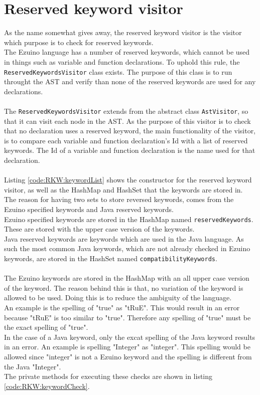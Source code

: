 \section{Reserved keyword visitor}
As the name somewhat gives away, the reserved keyword visitor is the visitor which purpose is to check for reserved keywords.\\
The Ezuino language has a number of reserved keywords, which cannot be used in things such as variable and function declarations. To uphold this rule, the \texttt{ReservedKeywordsVisitor} class exists. The purpose of this class is to run throught the AST and verify than none of the reserved keywords are used for any declarations.
\\\\
The \texttt{ReservedKeywordsVisitor} extends from the abstract class \texttt{AstVisitor}, so that it can visit each node in the AST. As the purpose of this visitor is to check that no declaration uses a reserved keyword, the main functionality of the visitor, is to compare each variable and function declaration's Id with a list of reserved keywords. The Id of a variable and function declaration is the name used for that declaration.
\\\\
Listing \ref{code:RKW:keywordList} shows the constructor for the reserved keyword visitor, as well as the HashMap and HashSet that the keywords are stored in. The reason for having two sets to store reversed keywords, comes from the Ezuino specified keywords and Java reserved keywords.\\
Ezuino specified keywords are stored in the HashMap named \texttt{reservedKeywords}. These are stored with the upper case version of the keywords.\\
Java reserved keywords are keywords which are used in the Java language. As such the most common Java keywords, which are not already checked in Ezuino keywords, are stored in the HashSet named \texttt{compatibilityKeywords}.
\\\\
The Ezuino keywords are stored in the HashMap with an all upper case version of the keyword. The reason behind this is that, no variation of the keyword is allowed to be used. Doing this is to reduce the ambiguity of the language.\\
An example is the spelling of "true" as "tRuE". This would result in an error because "tRuE" is too similar to "true". Therefore any spelling of "true" must be the exact spelling of "true".\\
In the case of a Java keyword, only the excat spelling of the Java keyword results in an error. An example is spelling "Integer" as "integer". This spelling would be allowed since "integer" is not a Ezuino keyword and the spelling is different from the Java "Integer".\\
The private methods for executing these checks are shown in listing \ref{code:RKW:keywordCheck}.\\

